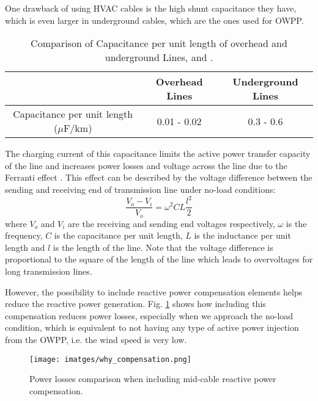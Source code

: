 \documentclass[a4paper,11pt, titlepage, twoside]{article}
\begin{document}
One drawback of using HVAC cables is the high shunt capacitance they have, which is even larger in underground cables,
which are the ones used for OWPP.

\begin{table}[h]
    \centering
    \begin{tabular}{|c|c|c|}
    \hline
     & Overhead Lines & Underground Lines \\
     \hline
    Capacitance per unit length ($\mu$F/km) & 0.01 - 0.02  & 0.3 - 0.6 \\
    \hline
    \end{tabular}
    \caption{Comparison of Capacitance per unit length of overhead and underground Lines, \cite{ABB} and \cite{overhead}. }
    \label{tab:capacitance_comparison}
    \end{table}

The charging current of this capacitance limits the active power transfer capacity of the line and increases
power losses and voltage across the line due to the Ferranti effect \cite{ferranti}. This effect can be described by the voltage difference between the sending and receiving end of transmission line under no-load conditions:
\begin{equation}
    \frac{V_{o} - V_{i}}{V_{o}} = \omega^2CL\frac{l^2}{2}
\end{equation}
where $V_{o}$ and $V_{i}$ are the receiving and sending end voltages respectively, $\omega$ is the frequency, $C$ is the capacitance per unit length, $L$ is the inductance per unit length and $l$ is the length of the line. Note that the voltage difference is
proportional to the square of the length of the line which leads to overvoltages for long transmission lines.\par

However, the possibility to include reactive power compensation elements helps reduce the reactive power generation. Fig. \ref{fig:whycomp} shows how including
this compensation reduces power losses, especially when we approach the no-load condition, which is equivalent to not having any type of active power injection from
the OWPP, i.e. the wind speed is very low.
\begin{figure}[h] %
	\centering
	\texttt{[image: imatges/why\_compensation.png]}
	\caption{Power losses comparison when including mid-cable reactive power compensation.}
	\label{fig:whycomp} %
\end{figure}
\end{document}
